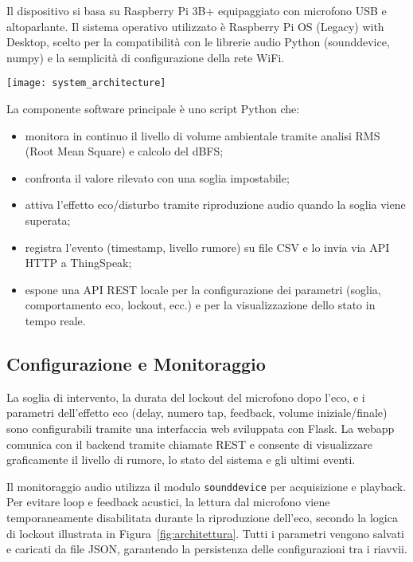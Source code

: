 Il dispositivo si basa su Raspberry Pi 3B+ equipaggiato con microfono USB e altoparlante. Il sistema operativo utilizzato è Raspberry Pi OS (Legacy) with Desktop, scelto per la compatibilità con le librerie audio Python (sounddevice, numpy) e la semplicità di configurazione della rete WiFi.

\begin{figure*}[ht]\centering
	\texttt{[image: system\_architecture]}
	\caption{Schema architetturale del sistema IoT Anti Collega Fastidioso.}
	\label{fig:architettura}
\end{figure*}

La componente software principale è uno script Python che:
\begin{itemize}
    \item monitora in continuo il livello di volume ambientale tramite analisi RMS (Root Mean Square) e calcolo del dBFS;
    \item confronta il valore rilevato con una soglia impostabile;
    \item attiva l’effetto eco/disturbo tramite riproduzione audio quando la soglia viene superata;
    \item registra l’evento (timestamp, livello rumore) su file CSV e lo invia via API HTTP a ThingSpeak;
    \item espone una API REST locale per la configurazione dei parametri (soglia, comportamento eco, lockout, ecc.) e per la visualizzazione dello stato in tempo reale.
\end{itemize}

\subsection{Configurazione e Monitoraggio}

La soglia di intervento, la durata del lockout del microfono dopo l’eco, e i parametri dell’effetto eco (delay, numero tap, feedback, volume iniziale/finale) sono configurabili tramite una interfaccia web sviluppata con Flask. La webapp comunica con il backend tramite chiamate REST e consente di visualizzare graficamente il livello di rumore, lo stato del sistema e gli ultimi eventi.

Il monitoraggio audio utilizza il modulo \texttt{sounddevice} per acquisizione e playback. Per evitare loop e feedback acustici, la lettura dal microfono viene temporaneamente disabilitata durante la riproduzione dell’eco, secondo la logica di lockout illustrata in Figura~\ref{fig:architettura}. Tutti i parametri vengono salvati e caricati da file JSON, garantendo la persistenza delle configurazioni tra i riavvii.

